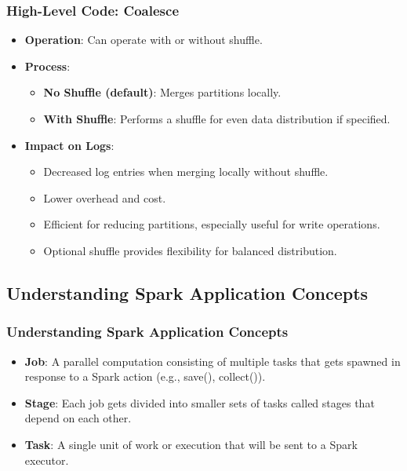 \begin{frame}
    \frametitle{High-Level Code: Coalesce}

    \begin{itemize}
        \begin{itemize}
            \item \textbf{Operation}: Can operate with or without shuffle.
            \item \textbf{Process}:
            \begin{itemize}
                \item \textbf{No Shuffle (default)}: Merges partitions locally.
                \item \textbf{With Shuffle}: Performs a shuffle for even data distribution if specified.
            \end{itemize}
            \item \textbf{Impact on Logs}:
            \begin{itemize}
                \item Decreased log entries when merging locally without shuffle.
                \item Lower overhead and cost.
                \item Efficient for reducing partitions, especially useful for write operations.
                \item Optional shuffle provides flexibility for balanced distribution.
            \end{itemize}
        \end{itemize}
    \end{itemize}
\end{frame}

\subsection{Understanding Spark Application Concepts}\label{subsec:understanding-spark-application-concepts}

\begin{frame}
    \frametitle{Understanding Spark Application Concepts}
    \begin{itemize}
        \item \textbf{Job}: A parallel computation consisting of multiple tasks that gets spawned in response
        to a Spark action (e.g., save(), collect()).
        \item \textbf{Stage}: Each job gets divided into smaller sets of tasks called stages that depend on each
        other.
        \item \textbf{Task}: A single unit of work or execution that will be sent to a Spark executor.
    \end{itemize}
\end{frame}

